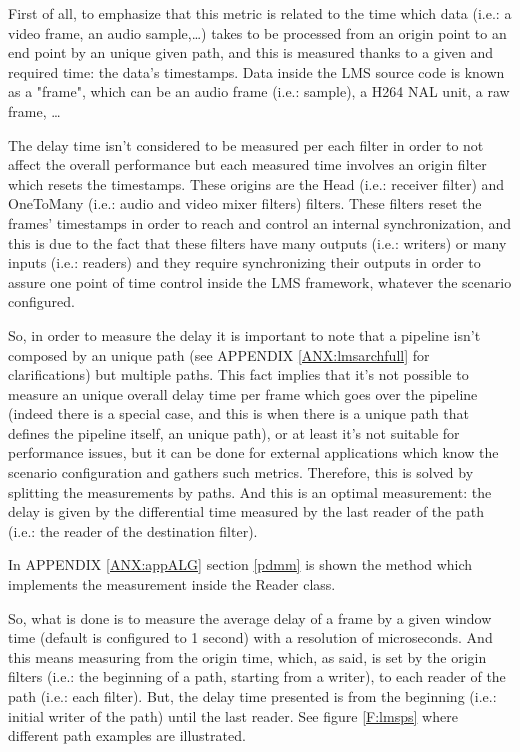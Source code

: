 First of all, to emphasize that this metric is related to the time which data (i.e.: a video frame, an audio sample,\ldots) takes to be processed from an origin point to an end point by an unique given path, and this is measured thanks to a given and required time: the data's timestamps. Data inside the LMS source code is known as a "frame", which can be an audio frame (i.e.: sample), a H264 NAL unit, a raw frame, \ldots 

The delay time isn't considered to be measured per each filter in order to not affect the overall performance but each measured time involves an origin filter which resets the timestamps. These origins are the Head (i.e.: receiver filter) and OneToMany (i.e.: audio and video mixer filters) filters. These filters reset the frames' timestamps in order to reach and control an internal synchronization, and this is due to the fact that these filters have many outputs (i.e.: writers) or many inputs (i.e.: readers) and they require synchronizing their outputs in order to assure one point of time control inside the LMS framework, whatever the scenario configured.

So, in order to measure the delay it is important to note that a pipeline isn't composed by an unique path (see APPENDIX \ref{ANX:lmsarchfull} for clarifications) but multiple paths. This fact implies that it's not possible to measure an unique overall delay time per frame which goes over the pipeline (indeed there is a special case, and this is when there is a unique path that defines the pipeline itself, an unique path), or at least it's not suitable for performance issues, but it can be done for external applications which know the scenario configuration and gathers such metrics. Therefore, this is solved by splitting the measurements by paths. And this is an optimal measurement: the delay is given by the differential time measured by the last reader of the path (i.e.: the reader of the destination filter).

In APPENDIX \ref{ANX:appALG} section \ref{pdmm} is shown the method which implements the measurement inside the Reader class.

So, what is done is to measure the average delay of a frame by a given window time (default is configured to 1 second) with a resolution of microseconds. And this means measuring from the origin time, which, as said, is set by the origin filters (i.e.: the beginning of a path, starting from a writer), to each reader of the path (i.e.: each filter). But, the delay time presented is from the beginning (i.e.: initial writer of the path) until the last reader. See figure \ref{F:lmsps} where different path examples are illustrated.

